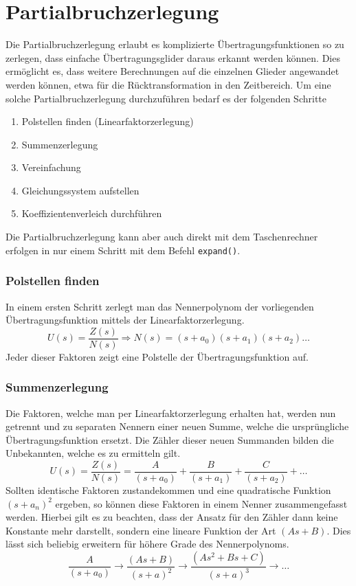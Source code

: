 \section{Partialbruchzerlegung}
Die Partialbruchzerlegung erlaubt es komplizierte Übertragungsfunktionen
so zu zerlegen, dass einfache Übertragungsglider daraus erkannt werden 
können. Dies ermöglicht es, dass weitere Berechnungen auf die einzelnen
Glieder angewandet werden können, etwa für die Rücktransformation in 
den Zeitbereich. Um eine solche Partialbruchzerlegung durchzuführen 
bedarf es der folgenden Schritte
%
\begin{enumerate}
    \item Polstellen finden (Linearfaktorzerlegung)
    \item Summenzerlegung
    \item Vereinfachung
    \item Gleichungssystem aufstellen
    \item Koeffizientenverleich durchführen
\end{enumerate}
%
Die Partialbruchzerlegung kann aber auch direkt mit dem Taschenrechner
erfolgen in nur einem Schritt mit dem Befehl \verb?expand()?.

\subsubsection{Polstellen finden}
In einem ersten Schritt zerlegt man das Nennerpolynom der vorliegenden 
Übertragungsfunktion mittels der Linearfaktorzerlegung.
\[  
    U(s) 
        = \frac{Z(s)}{N(s)} 
        \Rightarrow N(s) 
        = (s+a_0)(s+a_1)(s+a_2) \dots	
\]
Jeder dieser Faktoren zeigt eine Polstelle der Übertragungsfunktion auf.

\subsubsection{Summenzerlegung}
Die Faktoren, welche man per Linearfaktorzerlegung erhalten hat, werden
nun getrennt und zu separaten Nennern einer neuen Summe, welche die
ursprüngliche Übertragungsfunktion ersetzt. Die Zähler dieser neuen
Summanden bilden die Unbekannten, welche es zu ermitteln gilt.
\[  
    U(s) 
        = \frac{Z(s)}{N(s)} 
        = \frac{A}{(s+a_0)} + \frac{B}{(s+a_1)} + \frac{C}{(s+a_2)} + \dots 
\]
Sollten identische Faktoren zustandekommen und eine quadratische 
Funktion $(s+a_n)^2$ ergeben, so können diese Faktoren in einem Nenner
zusammengefasst werden. Hierbei gilt es zu beachten, dass
der Ansatz für den Zähler dann keine Konstante mehr darstellt, sondern 
eine lineare Funktion der Art $(As + B)$. Dies lässt sich beliebig erweitern
für höhere Grade des Nennerpolynoms.
\[  
    \frac{A}{(s+a_0)} 
    \rightarrow \frac{(As + B)}{(s+a)^2}
    \rightarrow \frac{(As^2 + Bs + C)}{(s+a)^3}
    \rightarrow \dots
\]

